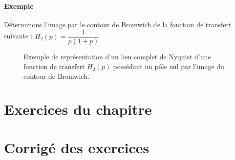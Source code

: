 \paragraph{Exemple}
Déterminons l'image par le contour de Bromwich de la fonction de transfert 
suivante : $H_2(p)=\dfrac{1}{p(1+p)}$
\begin{figure}[!h]
    \centering
    
    \caption{Exemple de représentation d'un lieu complet de Nyquist 
             d'une fonction de transfert $H_2(p)$ possédant un pôle nul par 
             l'image du contour de Bromwich. 
    \label{fig-nyquist_complet_contour} }
\end{figure}
\restoregeometry
\captionsetup{width=0.9\linewidth}
\section{Exercices du chapitre}
\section{Corrigé des exercices}

